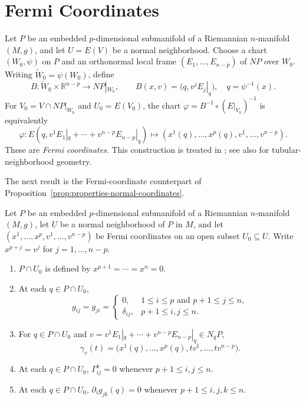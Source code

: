\section{Fermi Coordinates}

Let $P$ be an embedded $p$-dimensional submanifold of a Riemannian
$n$-manifold $(M,g)$, and let $U=E(V)$ be a normal neighborhood.  Choose a
chart $(W_0,\psi)$ on $P$ and an orthonormal local frame
$(E_1,\ldots,E_{n-p})$ of $NP$ over $W_0$.  Writing
$\widetilde W_0=\psi(W_0)$, define
\[
B:\widetilde W_0\times\mathbb R^{n-p}\longrightarrow NP|_{W_0},
\qquad
B(x,v)=\bigl(q,v^jE_j|_q\bigr),
\quad q=\psi^{-1}(x).
\]
For $V_0=V\cap NP|_{W_0}$ and $U_0=E(V_0)$, the chart
$\varphi=B^{-1}\circ(E|_{V_0})^{-1}$ is equivalently
\begin{equation}
\varphi: E\left(q, v^1 E_1|_q + \cdots + v^{n-p} E_{n-p}|_q\right)
\mapsto \left(x^1(q), \ldots, x^p(q), v^1, \ldots, v^{n-p}\right). \tag{5.25}
\end{equation}
These are \emph{Fermi coordinates}.  This construction is treated in
\cite{Gra82}; see also \cite{Gra04} for tubular-neighborhood geometry.

The next result is the Fermi-coordinate counterpart of
Proposition~\ref{prop:properties-normal-coordinates}.

\begin{proposition}
\label{prop:fermi-coordinates-properties}


Let $P$ be an embedded $p$-dimensional submanifold of a Riemannian
$n$-manifold $(M,g)$, let $U$ be a normal neighborhood of $P$ in $M$, and let
$(x^1, \ldots, x^p, v^1, \ldots, v^{n-p})$ be Fermi coordinates on an open
subset $U_0\subseteq U$.  Write $x^{p+j}=v^j$ for $j=1,\ldots,n-p$.
\begin{enumerate}
\item[(a)] $P\cap U_0$ is defined by $x^{p+1}=\cdots=x^n=0$.
\item[(b)] At each $q\in P\cap U_0$,
\[
g_{ij} = g_{ji} = \begin{cases}
0, & 1 \le i \le p \text{ and } p+1 \le j \le n, \\
\delta_{ij}, & p+1 \le i, j \le n.
\end{cases}
\]
\item[(c)] For $q\in P\cap U_0$ and
$v=v^1E_1|_q+\cdots+v^{n-p}E_{n-p}|_q\in N_qP$,
\[
\gamma_v(t)=\bigl(x^1(q),\ldots,x^p(q),tv^1,\ldots,tv^{n-p}\bigr).
\]
\item[(d)] At each $q\in P\cap U_0$, $\Gamma^k_{ij}=0$ whenever
$p+1\leq i,j\leq n$.
\item[(e)] At each $q\in P\cap U_0$, $\partial_i g_{jk}(q)=0$ whenever
$p+1\leq i,j,k\leq n$.
\end{enumerate}
\end{proposition}
